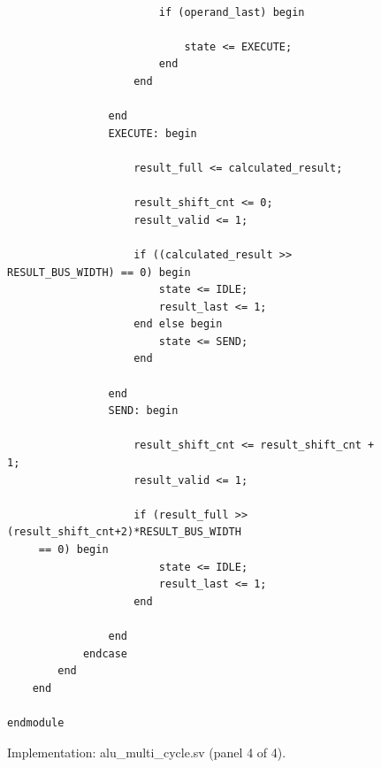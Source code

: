\documentclass[11pt,a4paper]{article}
\begin{document}
\begin{figure}[!htbp]\begin{minipage}{\linewidth}\fontsize{10}{11.4}\selectfont\begin{verbatim}

                        if (operand_last) begin
                            
                            state <= EXECUTE;
                        end
                    end

                end
                EXECUTE: begin

                    result_full <= calculated_result;

                    result_shift_cnt <= 0;
                    result_valid <= 1;               

                    if ((calculated_result >> RESULT_BUS_WIDTH) == 0) begin 
                        state <= IDLE;
                        result_last <= 1;
                    end else begin 
                        state <= SEND;
                    end

                end
                SEND: begin

                    result_shift_cnt <= result_shift_cnt + 1;
                    result_valid <= 1;

                    if (result_full >> (result_shift_cnt+2)*RESULT_BUS_WIDTH
     == 0) begin 
                        state <= IDLE;
                        result_last <= 1;
                    end

                end
            endcase
        end
    end

endmodule
\end{verbatim}\end{minipage}\caption{Implementation: alu\_multi\_cycle.sv (panel 4 of 4).}\end{figure}
\clearpage
\end{document}
